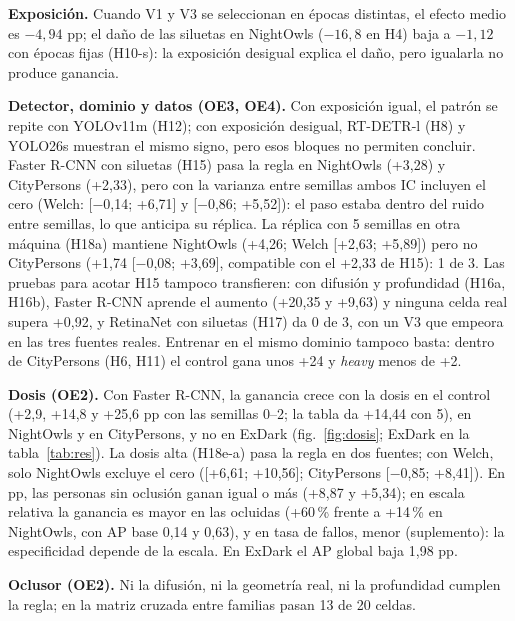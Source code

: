 \documentclass[conference]{IEEEtran}
\begin{document}
\textbf{Exposición.} Cuando V1 y V3 se seleccionan en épocas distintas, el efecto medio es $-4{,}94$ pp; el daño de las siluetas en NightOwls ($-16{,}8$ en H4) baja a $-1{,}12$ con épocas fijas (H10-s): la exposición desigual explica el daño, pero igualarla no produce ganancia.

\textbf{Detector, dominio y datos (OE3, OE4).} Con exposición igual, el patrón se repite con YOLOv11m (H12); con exposición desigual, RT-DETR-l (H8) y YOLO26s muestran el mismo signo, pero esos bloques no permiten concluir. Faster R-CNN con siluetas (H15) pasa la regla en NightOwls (+3,28) y CityPersons (+2,33), pero con la varianza entre semillas ambos IC incluyen el cero (Welch: [$-$0,14; +6,71] y [$-$0,86; +5,52]): el paso estaba dentro del ruido entre semillas, lo que anticipa su réplica. La réplica con 5 semillas en otra máquina (H18a) mantiene NightOwls (+4,26; Welch [+2,63; +5,89]) pero no CityPersons (+1,74 [$-$0,08; +3,69], compatible con el +2,33 de H15): 1 de 3. Las pruebas para acotar H15 tampoco transfieren: con difusión y profundidad (H16a, H16b), Faster R-CNN aprende el aumento (+20,35 y +9,63) y ninguna celda real supera +0,92, y RetinaNet con siluetas (H17) da 0 de 3, con un V3 que empeora en las tres fuentes reales. Entrenar en el mismo dominio tampoco basta: dentro de CityPersons (H6, H11) el control gana unos +24 y \emph{heavy} menos de +2.

\textbf{Dosis (OE2).} Con Faster R-CNN, la ganancia crece con la dosis en el control (+2,9, +14,8 y +25,6 pp con las semillas 0--2; la tabla da +14,44 con 5), en NightOwls y en CityPersons, y no en ExDark (fig.~\ref{fig:dosis}; ExDark en la tabla~\ref{tab:res}). La dosis alta (H18e-a) pasa la regla en dos fuentes; con Welch, solo NightOwls excluye el cero ([+6,61; +10,56]; CityPersons [$-$0,85; +8,41]). En pp, las personas sin oclusión ganan igual o más (+8,87 y +5,34); en escala relativa la ganancia es mayor en las ocluidas (+60\,\% frente a +14\,\% en NightOwls, con AP base 0,14 y 0,63), y en tasa de fallos, menor (suplemento): la especificidad depende de la escala. En ExDark el AP global baja 1,98 pp.

\textbf{Oclusor (OE2).} Ni la difusión, ni la geometría real, ni la profundidad cumplen la regla; en la matriz cruzada entre familias pasan 13 de 20 celdas.
\end{document}
